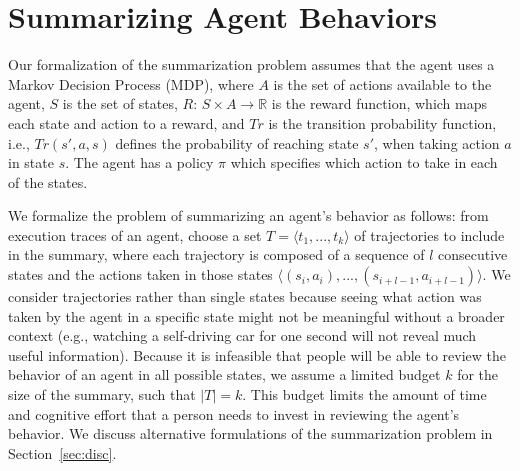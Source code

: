 \section{Summarizing Agent Behaviors}
\label{sec:problem}
Our formalization of the summarization problem assumes that the agent uses a Markov Decision Process (MDP), where $A$ is the set of actions available to the agent, $S$ is the set of states, $R$: $S \times A \rightarrow \mathbb{R}$ is the reward function, which maps each state and action to a reward, and $Tr$ is the transition probability function, i.e., $Tr(s', a, s)$ defines the probability of reaching state $s'$, when taking action $a$ in state $s$. The agent has a policy $\pi$ which specifies which action to take in each of the states. 

We formalize the problem of summarizing an agent's behavior as follows: from execution traces of an agent, choose a set $T = \langle t_{1},...,t_{k} \rangle$ of trajectories to include in the summary, where each trajectory is composed of a sequence of $l$ consecutive states and the actions taken in those states $\langle(s_{i},a_{i}),...,(s_{i+l-1},a_{i+l-1})\rangle$. We consider trajectories rather than single states because seeing what action was taken by the agent in a specific state might not be meaningful without a broader context (e.g., watching a self-driving car for one second will not reveal much useful information). Because it is infeasible that people will be able to review the behavior of an agent in all possible states, we assume a limited budget $k$ for the size of the summary, such that $|T| = k$. This budget limits the amount of time and cognitive effort that a person needs to invest in reviewing the agent's behavior. We discuss alternative formulations of the summarization problem in Section~\ref{sec:disc}. 

